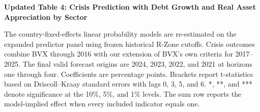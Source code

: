 \documentclass[10pt]{article}
\begin{document}
\noindent\textbf{Updated Table 4: Crisis Prediction with Debt Growth and Real Asset Appreciation by Sector}

\smallskip
\noindent\scriptsize
The country-fixed-effects linear probability models are re-estimated on the
expanded predictor panel using frozen historical R-Zone cutoffs. Crisis
outcomes combine BVX through 2016 with our extension of BVX's own criteria
for 2017--2025. The final valid forecast origins are 2024, 2023,
2022, and 2021 at horizons one through four. Coefficients are percentage
points. Brackets report t-statistics based on Driscoll--Kraay standard errors
with lags 0, 3, 5, and 6. *, **, and *** denote significance at the 10\%, 5\%,
and 1\% levels. The sum row reports the model-implied effect when every
included indicator equals one.

\normalsize
\medskip

\end{document}
